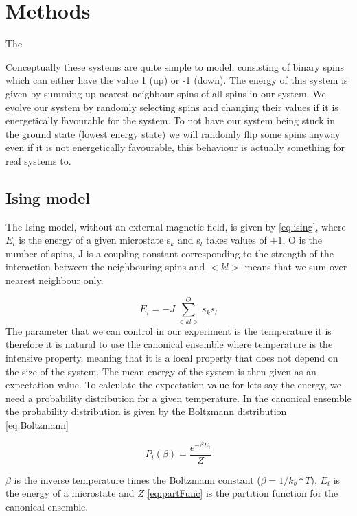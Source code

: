 \section{Methods}

The 

Conceptually these systems are quite simple to model,
consisting of binary spins which can either have the value 1 (up) or -1 (down).
The energy of this system is given by summing up nearest neighbour spins of all
spins in our system. We evolve our system by randomly selecting spins and
changing their values if it is energetically favourable for the system. To not
have our system being stuck in the ground state (lowest energy state) we will randomly flip some spins
anyway even if it is not energetically favourable, this behaviour is actually
something for real systems to. 
\subsection{Ising model}
The Ising model, without an external magnetic field, is given by
\cref{eq:ising}, where $E_i$ is the energy of a given microstate s$_k$ and s$_l$ takes values of $\pm 1$, O is the
number of spins, J is a coupling constant corresponding to the strength of the
interaction between the neighbouring spins and $<kl>$ means that we sum over
nearest neighbour only. 

\begin{equation}\label{eq:ising}
  E_i = -J\sum_{<kl>}^{O} s_k s_l
\end{equation}
The parameter that we can control in our experiment is the temperature it is
therefore it is natural to
use the canonical ensemble where temperature is the intensive property, meaning
that it is a local property that does not depend on the size of the system. The
mean energy of the system is then given as an expectation value. To calculate
the expectation value for lets say the energy, we need a probability distribution
for a given temperature. In the canonical ensemble the probability distribution
is given by the Boltzmann distribution \cref{eq:Boltzmann}

\begin{equation}\label{eq:Boltzmann}
  P_i(\beta) = \frac{e^{-\beta E_i}}{Z}
\end{equation}

$\beta$ is the inverse temperature times the Boltzmann constant 
($\beta = 1/k_b*T $),  $E_i$ is the energy of a microstate and $Z$
\cref{eq:partFunc} is the partition function for the canonical ensemble.

